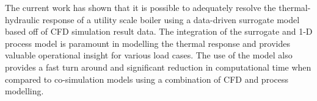 \documentclass[a4paper,fleqn]{cas-sc}
\begin{document}
The current work has shown that it is possible to adequately resolve the thermal-hydraulic response of a utility scale boiler using a data-driven surrogate model based off of CFD simulation result data. The integration of the surrogate and 1-D process model is paramount in modelling the thermal response and provides valuable operational insight for various load cases. The use of the model also provides a fast turn around and significant reduction in computational time when compared to co-simulation models using a combination of CFD and process modelling.
\printcredits

%


\end{document}
